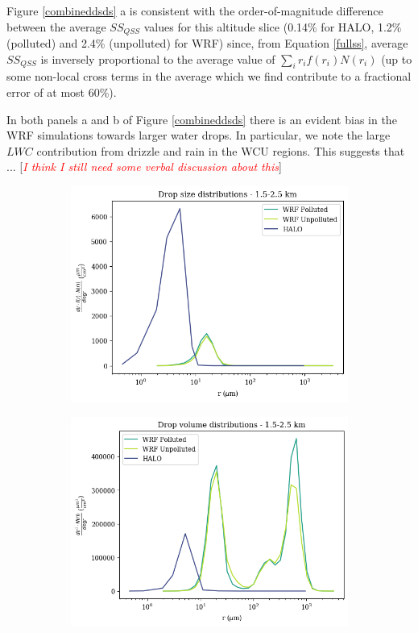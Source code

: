 \documentclass{article}
\newcommand{\klcomm}[1]{\textcolor{red}{\textit{#1}}}
\begin{document}
Figure \ref{combineddsds} a is consistent with the order-of-magnitude difference between the average $SS_{QSS}$ values for this altitude slice (0.14\% for HALO, 1.2\% (polluted) and 2.4\% (unpolluted) for WRF) since, from Equation \ref{fullss}, average $SS_{QSS}$ is inversely proportional to the average value of $\sum\limits_{i}r_if(r_i)N(r_i)$ (up to some non-local cross terms in the average which we find contribute to a fractional error of at most 60\%). 

In both panels a and b of Figure \ref{combineddsds} there is an evident bias in the WRF simulations towards larger water drops. In particular, we note the large $LWC$ contribution from drizzle and rain in the WCU regions. This suggests that ... [\klcomm{I think I still need some verbal discussion about this}]

\begin{figure}[ht]
	\centering
	\begin{subfigure}{0.7\textwidth}
		\includegraphics[width=\textwidth]{halo/halo_slice_meanr_dsd_alldates_figure.png}
		\label{combineddsdssize}
		\caption{}
	\end{subfigure}
	\begin{subfigure}{0.7\textwidth}
		\includegraphics[width=\textwidth]{halo/no_vent_halo_slice_meanr_dsd_alldates_vol_figure.png}

\end{subfigure}
\end{figure}
\end{document}
